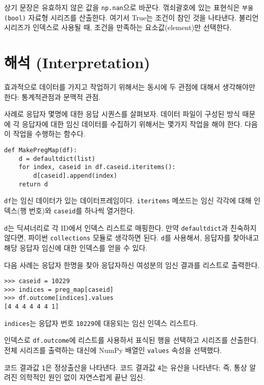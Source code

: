 상기 문장은 유효하지 않은 값을 {\tt np.nan}으로 바꾼다. 꺾쇠괄호에 있는 표현식은 {\tt 부울(bool)} 자료형 시리즈를 산출한다. 여기서 True는 조건이 참인 것을 나타낸다. 불리언 시리즈가 인덱스로 사용될 때, 조건을 만족하는 요소값(element)만 선택한다. 



\section{해석 (Interpretation)}

효과적으로 데이터를 가지고 작업하기 위해서는 동시에 두 관점에 대해서 생각해야만 한다: 통계적관점과 문맥적 관점.

사례로 응답자 몇명에 대한 응답 시퀀스를 살펴보자. 
데이터 파일이 구성된 방식 때문에 각 응답자에 대한 임신 데이터를 수집하기 위해서는 몇가지 작업을 해야 한다. 다음이 작업을 수행하는 함수다.

\begin{verbatim}
def MakePregMap(df):
    d = defaultdict(list)
    for index, caseid in df.caseid.iteritems():
        d[caseid].append(index)
    return d
\end{verbatim}

{\tt df}는 임신 데이터가 있는 데이터프레임이다. 
{\tt iteritems} 메쏘드는 임신 각각에 대해 인덱스(행 번호)와 {\tt caseid}를 하나씩 열거한다.


{\tt d}는 딕셔너리로 각 ID에서 인덱스 리스트로 매핑한다. 
만약 {\tt defaultdict}과 친숙하지 않다면, 파이썬 {\tt collections} 모듈로 생각하면 된다.
{\tt d}를 사용해서, 응답자를 찾아내고 해당 응답자 임신에 대한 인덱스를 얻을 수 있다. 

다음 사례는 응답자 한명을 찾아 응답자하신 여성분의 임신 결과를 리스트로 출력한다. 

\begin{verbatim}
>>> caseid = 10229
>>> indices = preg_map[caseid]
>>> df.outcome[indices].values
[4 4 4 4 4 4 1]
\end{verbatim}

{\tt indices}는 응답자 번호 {\tt 10229}에 대응되는 임신 인덱스 리스트다.

인덱스로 {\tt df.outcome}에 리스트를 사용하서 표식된 행을 선택하고 시리즈를 산출한다.
전체 시리즈를 출력하는 대신에 NumPy 배열인 {\tt values} 속성을 선택했다.

코드 결과값 {\tt 1}은 정상출산을 나타낸다. 코드 결과값 {\tt 4}는 유산을 나타낸다; 
즉, 통상 알려진 의학적인 원인 없이 자연스럽게 끝난 임신.

